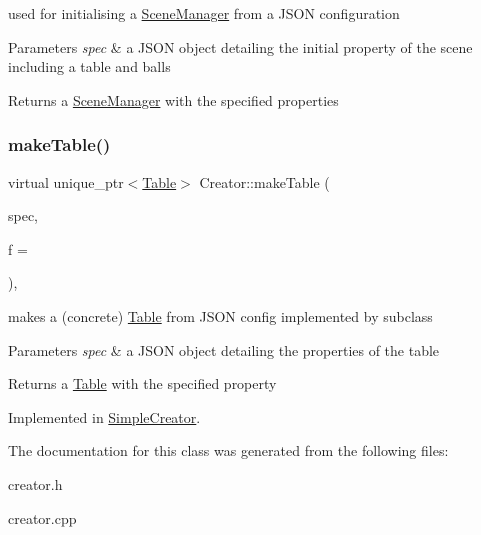 used for initialising a \mbox{\hyperlink{class_scene_manager}{Scene\+Manager}} from a J\+S\+ON configuration 


\begin{DoxyParams}{Parameters}
{\em spec} & a J\+S\+ON object detailing the initial property of the scene including a table and balls\\
\hline
\end{DoxyParams}
\begin{DoxyReturn}{Returns}
a \mbox{\hyperlink{class_scene_manager}{Scene\+Manager}} with the specified properties 
\end{DoxyReturn}
\mbox{\label{class_creator_a70c571c0b776a5f29494f660957e0710}} 
\subsubsection{\texorpdfstring{make\+Table()}{makeTable()}}
{\footnotesize\ttfamily virtual unique\+\_\+ptr$<$\mbox{\hyperlink{class_table}{Table}}$>$ Creator\+::make\+Table (\begin{DoxyParamCaption}\item[{const Q\+Json\+Object \&}]{spec,  }\item[{int}]{f = {} }\end{DoxyParamCaption})\hspace{0.3cm}{\ttfamily [protected]}, {}}



makes a (concrete) \mbox{\hyperlink{class_table}{Table}} from J\+S\+ON config implemented by subclass 


\begin{DoxyParams}{Parameters}
{\em spec} & a J\+S\+ON object detailing the properties of the table\\
\hline
\end{DoxyParams}
\begin{DoxyReturn}{Returns}
a \mbox{\hyperlink{class_table}{Table}} with the specified property 
\end{DoxyReturn}


Implemented in \mbox{\hyperlink{class_simple_creator_af6556afca4e573deaaf624e8be14dfae}{Simple\+Creator}}.



The documentation for this class was generated from the following files\+:\begin{DoxyCompactItemize}
\item 
creator.\+h\item 
creator.\+cpp\end{DoxyCompactItemize}
